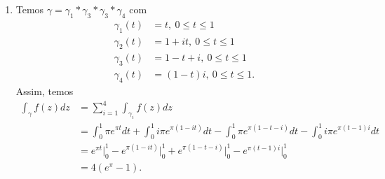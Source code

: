 \documentclass[12pt,a4paper]{article}
\begin{document}
\begin{enumerate}
\begin{enumerate}
			\item Temos $\gamma = \gamma_1*\gamma_3*\gamma_3*\gamma_4$ com
			\begin{align*}
			\gamma_1(t) &= t, \ 0\leq t\leq 1 \\ 
			\gamma_2(t) &= 1+it, \ 0\leq t\leq 1 \\
			\gamma_3(t) &= 1-t+i, \ 0\leq t\leq 1 \\
			\gamma_4(t) &= (1-t)i, \ 0\leq t\leq 1.
			\end{align*}
			Assim, temos
			\begin{align*}
			\int_{\gamma}f(z)dz &= \sum_{i=1}^{4}\int_{\gamma_i}f(z)dz \\
			&= \int_{0}^{1}\pi e^{\pi t}dt + \int_{0}^{1}i\pi e^{\pi (1-it)}dt - \int_{0}^{1}\pi e^{\pi (1-t-i)}dt - \int_{0}^{1}i\pi e^{\pi (t-1)i}dt \\
			&= e^{\pi t}\Bigg|_{0}^{1} - e^{\pi (1-it)}\Bigg|_{0}^{1} + e^{\pi (1-t-i)}\Bigg|_{0}^{1} - e^{\pi (t-1)i}\Bigg|_{0}^{1} \\
			&= 4(e^\pi - 1).
			\end{align*}
		\end{enumerate}
	\end{enumerate}
\end{document}
